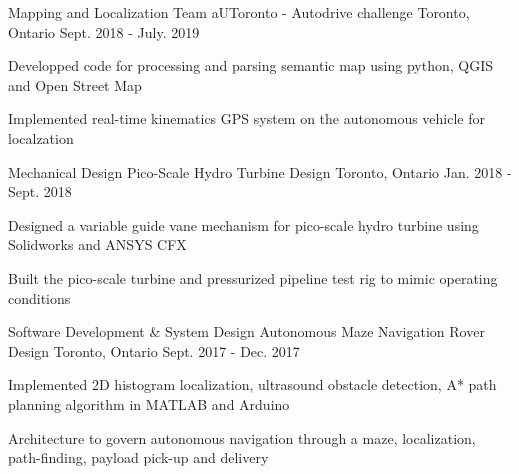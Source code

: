 \begin{cventries}
  \cventry
  {Mapping and Localization Team}
  {aUToronto - Autodrive challenge}
  {Toronto, Ontario}
  {Sept. 2018 - July. 2019}
  {
    \begin{cvitems}
      \item {Developped code for processing and parsing semantic map using python, QGIS and Open Street Map}
      \item {Implemented real-time kinematics GPS system on the autonomous vehicle for localzation}
    \end{cvitems}
  }

  \cventry
    {Mechanical Design}
    {Pico-Scale Hydro Turbine Design}
    {Toronto, Ontario}
    {Jan. 2018 - Sept. 2018}
    {
      \begin{cvitems}
        \item {Designed a variable guide vane mechanism for pico-scale hydro turbine using Solidworks and ANSYS CFX}
        \item {Built the pico-scale turbine and pressurized pipeline test rig to mimic operating conditions}
      \end{cvitems}
    }

    \cventry
    {Software Development \& System Design}
    {Autonomous Maze Navigation Rover Design}
    {Toronto, Ontario}
    {Sept. 2017 - Dec. 2017}
    {
      \begin{cvitems}
        \item {Implemented 2D histogram localization, ultrasound obstacle detection, A* path planning algorithm in MATLAB and Arduino}
        \item {Architecture to govern autonomous navigation through a maze, localization, path-finding, payload pick-up and delivery}
      \end{cvitems}
    }


\end{cventries}